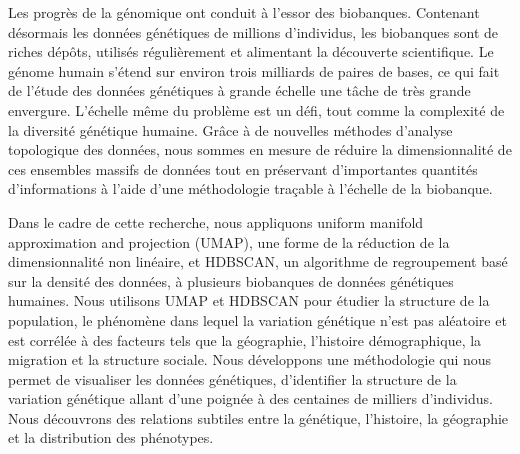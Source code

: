 Les progrès de la génomique ont conduit à l'essor des biobanques. Contenant désormais les données génétiques de millions d'individus, les biobanques sont de riches dépôts, utilisés régulièrement et alimentant la découverte scientifique. Le génome humain s'étend sur environ trois milliards de paires de bases, ce qui fait de l'étude des données génétiques à grande échelle une tâche de très grande envergure. L'échelle même du problème est un défi, tout comme la complexité de la diversité génétique humaine. Grâce à de nouvelles méthodes d'analyse topologique des données, nous sommes en mesure de réduire la dimensionnalité de ces ensembles massifs de données tout en préservant d'importantes quantités d'informations à l'aide d'une méthodologie traçable à l'échelle de la biobanque.

Dans le cadre de cette recherche, nous appliquons uniform manifold approximation and projection (UMAP), une forme de la réduction de la dimensionnalité non linéaire, et HDBSCAN, un algorithme de regroupement basé sur la densité des données, à plusieurs biobanques de données génétiques humaines. Nous utilisons UMAP et HDBSCAN pour étudier la structure de la population, le phénomène dans lequel la variation génétique n'est pas aléatoire et est corrélée à des facteurs tels que la géographie, l'histoire démographique, la migration et la structure sociale. Nous développons une méthodologie qui nous permet de visualiser les données génétiques, d'identifier la structure de la variation génétique allant d'une poignée à des centaines de milliers d'individus. Nous découvrons des relations subtiles entre la génétique, l'histoire, la géographie et la distribution des phénotypes.